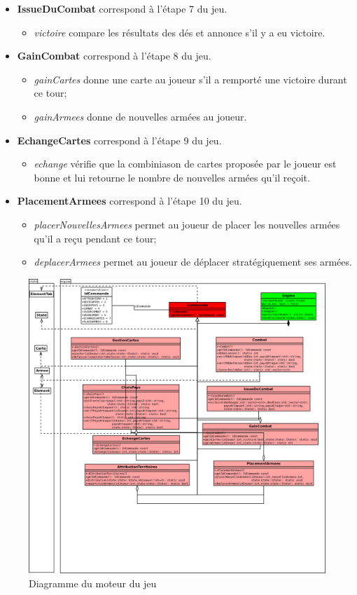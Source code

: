 \begin{itemize}
    \item \textbf{IssueDuCombat} correspond à l'étape 7 du jeu. 
    \begin{itemize}
        \item \textit{victoire} compare les résultats des dés et annonce s'il y a eu victoire.
    \end{itemize}
    
    \item \textbf{GainCombat} correspond à l'étape 8 du jeu. 
    \begin{itemize}
        \item \textit{gainCartes} donne une carte au joueur s'il a remporté une victoire durant ce tour;
        \item \textit{gainArmees} donne de nouvelles armées au joueur.
    \end{itemize}
    
    \item \textbf{EchangeCartes} correspond à l'étape 9 du jeu. 
    \begin{itemize}
        \item \textit{echange} vérifie que la combiniason de cartes proposée par le joueur est bonne et lui retourne le nombre de nouvelles armées qu'il reçoit.
    \end{itemize}
    
    \item \textbf{PlacementArmees} correspond à l'étape 10 du jeu. 
    \begin{itemize}
        \item \textit{placerNouvellesArmees} permet au joueur de placer les nouvelles armées qu'il a reçu pendant ce tour;
        \item \textit{deplacerArmees} permet au joueur de déplacer stratégiquement ses armées.
    \end{itemize}
\end{itemize}

\begin{landscape}
    \begin{figure}[!htbp]
        \centering
        \includegraphics[width=17cm]{Images/engine.png}
        \caption{Diagramme du moteur du jeu}
        \label{fig:moteur}
    \end{figure}
\end{landscape}